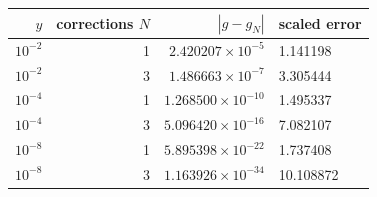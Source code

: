 \begin{tabular}{@{}rrrl@{}}
\toprule
$y$ & corrections $N$ & $|g-g_N|$ & scaled error\\
\midrule
$10^{-2}$ & 1 & $2.420207\times10^{-5}$ & 1.141198\\
$10^{-2}$ & 3 & $1.486663\times10^{-7}$ & 3.305444\\
$10^{-4}$ & 1 & $1.268500\times10^{-10}$ & 1.495337\\
$10^{-4}$ & 3 & $5.096420\times10^{-16}$ & 7.082107\\
$10^{-8}$ & 1 & $5.895398\times10^{-22}$ & 1.737408\\
$10^{-8}$ & 3 & $1.163926\times10^{-34}$ & 10.108872\\
\bottomrule
\end{tabular}
